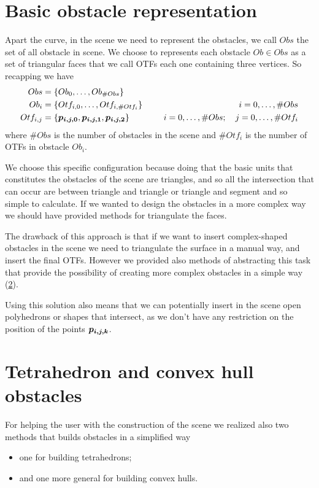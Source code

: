 \documentclass[dissertation.tex]{subfiles}
\begin{document}
\section{Basic obstacle representation}
Apart the curve, in the scene we need to represent the obstacles, we
call $Obs$ the set of all obstacle in scene. We choose to represents
each obstacle $Ob\in Obs$ as a set of triangular faces that we call
\acp{OTF} each one containing three vertices. So recapping we have
\begin{equation*}
  \begin{split}
    Obs&=\{Ob_0,\dots,Ob_{\#Obs}\}\\
    Ob_i&=\{Otf_{i,0},\dots,Otf_{i,\#Otf_i}\}&i=0,\dots,\#Obs\\
    Otf_{i,j}&=\{\boldsymbol{p_{i,j,0}},\boldsymbol{p_{i,j,1}},\boldsymbol{p_{i,j,2}}\}\quad\qquad&
    i=0,\dots,\#Obs;\quad j=0,\dots,\#Otf_i
  \end{split}
\end{equation*}
where $\#Obs$ is the number of obstacles in the scene and $\#Otf_i$ is
the number of \acp{OTF} in obstacle $Ob_i$.

We choose this specific configuration because doing that the basic units that
constitutes the obstacles of the scene are triangles, and so all the
intersection that can occur are between triangle and triangle or
triangle and segment and so simple to calculate. If we wanted to
design the obstacles in a more complex way we should have provided
methods for triangulate the faces. 

The drawback of this approach is that if we want to insert
complex-shaped obstacles in the scene we need to triangulate the
surface in a manual way, and insert the final \acp{OTF}. However we
provided also methods
of abstracting this task that provide the possibility of creating more
complex obstacles in a simple way (\cref{sec:complexObs}).

Using this solution also means that we can potentially insert in the
scene open polyhedrons or shapes that intersect, as we don't have
any restriction on the position of the points $\boldsymbol{p_{i,j,k}}$.

\section{Tetrahedron and convex hull obstacles}\label{sec:complexObs}
For helping the user with the construction of the scene we realized
also two methods that builds obstacles in a simplified way
\begin{itemize}
\item one for building tetrahedrons;
\item and one more general for building convex hulls.
\end{itemize}
\end{document}
